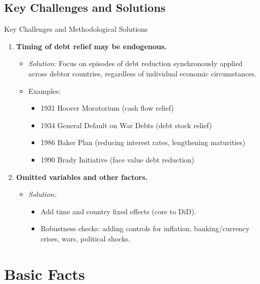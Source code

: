 \documentclass{beamer}
\begin{document}
\subsection{Key Challenges and Solutions}
\begin{frame}{Key Challenges and Methodological Solutions}
  \begin{enumerate}
    \item \textbf{Timing of debt relief may be endogenous.}
    \begin{itemize}
        \item \textit{Solution:} Focus on episodes of debt reduction synchronously applied across debtor countries, regardless of individual economic circumstances.
        \item Examples:
        \begin{itemize}
            \item 1931 Hoover Moratorium (cash flow relief)
            \item 1934 General Default on War Debts (debt stock relief)
            \item 1986 Baker Plan (reducing interest rates, lengthening maturities)
            \item 1990 Brady Initiative (face value debt reduction)
        \end{itemize}
    \end{itemize}
    \item \textbf{Omitted variables and other factors.}
    \begin{itemize}
        \item \textit{Solution:}
        \begin{itemize}
            \item Add time and country fixed effects (core to DiD).
            \item Robustness checks: adding controls for inflation, banking/currency crises, wars, political shocks.
        \end{itemize}
    \end{itemize}
  \end{enumerate}
\end{frame}

\section{Basic Facts}
\end{document}
